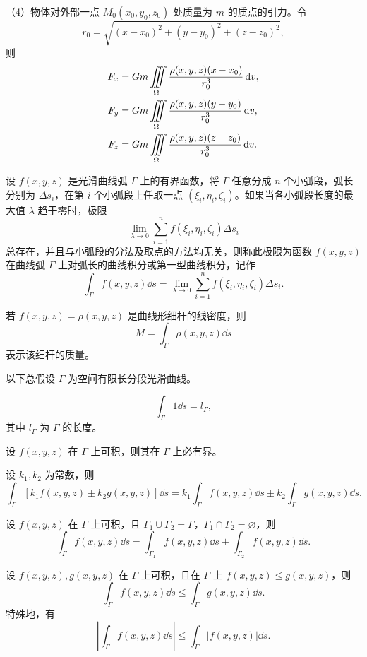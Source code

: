 （4）物体对外部一点 $M_0(x_0,y_0,z_0)$ 处质量为 $m$ 的质点的引力。令
\[
r_0=\sqrt{(x-x_0)^2+(y-y_0)^2+(z-z_0)^2},
\]
则
\begin{align*}
F_x&=Gm\iiint\limits_{\Omega}\frac{\rho(x,y,z)(x-x_0)}{r_0^3}\mathop{}\!\mathrm d v,\\
F_y&=Gm\iiint\limits_{\Omega}\frac{\rho(x,y,z)(y-y_0)}{r_0^3}\mathop{}\!\mathrm d v,\\
F_z&=Gm\iiint\limits_{\Omega}\frac{\rho(x,y,z)(z-z_0)}{r_0^3}\mathop{}\!\mathrm d v.
\end{align*}



设 $f(x,y,z)$ 是光滑曲线弧 $\Gamma$ 上的有界函数，将 $\Gamma$ 任意分成 $n$ 个小弧段，弧长分别为 $\Delta s_i$，在第 $i$ 个小弧段上任取一点 $(\xi_i,\eta_i,\zeta_i)$。如果当各小弧段长度的最大值 $\lambda$ 趋于零时，极限
\[
\lim_{\lambda\to0}\sum_{i=1}^{n}f(\xi_i,\eta_i,\zeta_i)\Delta s_i
\]
总存在，并且与小弧段的分法及取点的方法均无关，则称此极限为函数 $f(x,y,z)$ 在曲线弧 $\Gamma$ 上对弧长的曲线积分或第一型曲线积分，记作
\[
\int_{\Gamma}f(x,y,z)\dd s
=\lim_{\lambda\to0}\sum_{i=1}^{n}f(\xi_i,\eta_i,\zeta_i)\Delta s_i.
\]

\begin{notebox}
若 $f(x,y,z)=\rho(x,y,z)$ 是曲线形细杆的线密度，则
\[
M=\int_{\Gamma}\rho(x,y,z)\dd s
\]
表示该细杆的质量。
\end{notebox}


以下总假设 $\Gamma$ 为空间有限长分段光滑曲线。

\[
\int_{\Gamma}1\dd s=l_{\Gamma},
\]
其中 $l_{\Gamma}$ 为 $\Gamma$ 的长度。

设 $f(x,y,z)$ 在 $\Gamma$ 上可积，则其在 $\Gamma$ 上必有界。

设 $k_1,k_2$ 为常数，则
\[
\int_{\Gamma}[k_1f(x,y,z)\pm k_2g(x,y,z)]\dd s
=k_1\int_{\Gamma}f(x,y,z)\dd s
\pm k_2\int_{\Gamma}g(x,y,z)\dd s.
\]

设 $f(x,y,z)$ 在 $\Gamma$ 上可积，且 $\Gamma_1\cup\Gamma_2=\Gamma$，$\Gamma_1\cap\Gamma_2=\varnothing$，则
\[
\int_{\Gamma}f(x,y,z)\dd s
=\int_{\Gamma_1}f(x,y,z)\dd s
+\int_{\Gamma_2}f(x,y,z)\dd s.
\]

设 $f(x,y,z),g(x,y,z)$ 在 $\Gamma$ 上可积，且在 $\Gamma$ 上 $f(x,y,z)\le g(x,y,z)$，则
\[
\int_{\Gamma}f(x,y,z)\dd s\le\int_{\Gamma}g(x,y,z)\dd s.
\]
特殊地，有
\[
\left|\int_{\Gamma}f(x,y,z)\dd s\right|
\le\int_{\Gamma}|f(x,y,z)|\dd s.
\]

